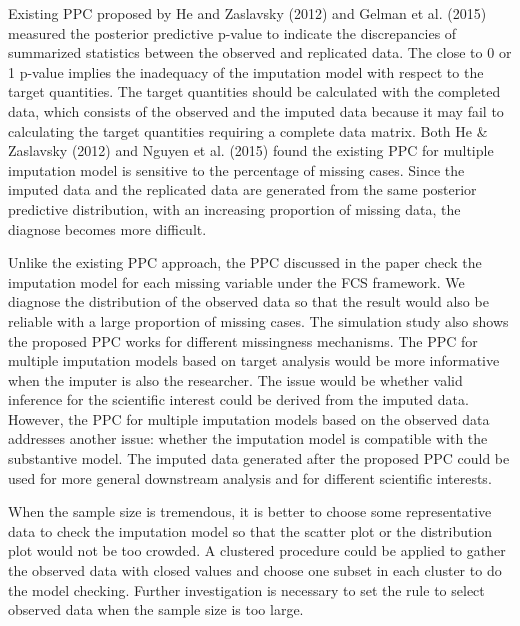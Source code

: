 \documentclass[12pt, fullpage, a4paper]{article}
\begin{document}
Existing PPC proposed by He and Zaslavsky (2012) and Gelman et al. (2015) measured the posterior predictive p-value to indicate the discrepancies of summarized statistics between the observed and replicated data. The close to 0 or 1 p-value implies the inadequacy of the imputation model with respect to the target quantities. The target quantities should be calculated with the completed data, which consists of the observed and the imputed data because it may fail to calculating the target quantities requiring a complete data matrix. Both He \& Zaslavsky (2012) and Nguyen et al. (2015) found the existing PPC for multiple imputation model is sensitive to the percentage of missing cases. Since the imputed data and the replicated data are generated from the same posterior predictive distribution, with an increasing proportion of missing data, the diagnose becomes more difficult.

Unlike the existing PPC approach, the PPC discussed in the paper check the imputation model for each missing variable under the FCS framework. We diagnose the distribution of the observed data so that the result would also be reliable with a large proportion of missing cases. The simulation study also shows the proposed PPC works for different missingness mechanisms. The PPC for multiple imputation models based on target analysis would be more informative when the imputer is also the researcher. The issue would be whether valid inference for the scientific interest could be derived from the imputed data. However, the PPC for multiple imputation models based on the observed data addresses another issue: whether the imputation model is compatible with the substantive model. The imputed data generated after the proposed PPC could be used for more general downstream analysis and for different scientific interests.

When the sample size is tremendous, it is better to choose some representative data to check the imputation model so that the scatter plot or the distribution plot would not be too crowded. A clustered procedure could be applied to gather the observed data with closed values and choose one subset in each cluster to do the model checking. Further investigation is necessary to set the rule to select observed data when the sample size is too large.

\newpage


\end{document}

